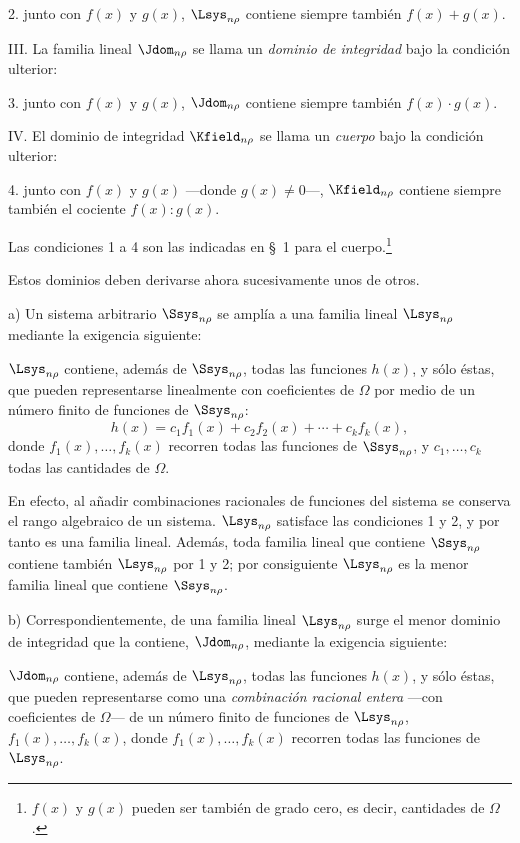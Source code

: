\documentclass[11pt]{article}
\begin{document}
2. junto con $f(x)$ y $g(x)$, $\Lsys_{n\rho}$ contiene siempre también $f(x)+g(x)$.

III. La familia lineal $\Jdom_{n\rho}$ se llama un \emph{dominio de integridad} bajo la condición ulterior:

3. junto con $f(x)$ y $g(x)$, $\Jdom_{n\rho}$ contiene siempre también $f(x)\cdot g(x)$.

IV. El dominio de integridad $\Kfield_{n\rho}$ se llama un \emph{cuerpo} bajo la condición ulterior:

4. junto con $f(x)$ y $g(x)$ ---donde $g(x)\ne0$---, $\Kfield_{n\rho}$ contiene siempre también el cociente $f(x):g(x)$.

Las condiciones 1 a 4 son las indicadas en \S\ 1 para el cuerpo.\footnote{$f(x)$ y $g(x)$ pueden ser también de grado cero, es decir, cantidades de $\Omega$.}

Estos dominios deben derivarse ahora sucesivamente unos de otros.

a) Un sistema arbitrario $\Ssys_{n\rho}$ se amplía a una familia lineal $\Lsys_{n\rho}$ mediante la exigencia siguiente:

$\Lsys_{n\rho}$ contiene, además de $\Ssys_{n\rho}$, todas las funciones $h(x)$, y sólo éstas, que pueden representarse linealmente con coeficientes de $\Omega$ por medio de un número finito de funciones de $\Ssys_{n\rho}$:
\[
  h(x)=c_1f_1(x)+c_2f_2(x)+\cdots+c_kf_k(x),
\]
donde $f_1(x),\ldots,f_k(x)$ recorren todas las funciones de $\Ssys_{n\rho}$, y $c_1,
\ldots,c_k$ todas las cantidades de $\Omega$.

En efecto, al añadir combinaciones racionales de funciones del sistema se conserva el rango algebraico de un sistema. $\Lsys_{n\rho}$ satisface las condiciones 1 y 2, y por tanto es una familia lineal. Además, toda familia lineal que contiene $\Ssys_{n\rho}$ contiene también $\Lsys_{n\rho}$ por 1 y 2; por consiguiente $\Lsys_{n\rho}$ es la menor familia lineal que contiene $\Ssys_{n\rho}$.

b) Correspondientemente, de una familia lineal $\Lsys_{n\rho}$ surge el menor dominio de integridad que la contiene, $\Jdom_{n\rho}$, mediante la exigencia siguiente:

$\Jdom_{n\rho}$ contiene, además de $\Lsys_{n\rho}$, todas las funciones $h(x)$, y sólo éstas, que pueden representarse como una \emph{combinación racional entera} ---con coeficientes de $\Omega$--- de un número finito de funciones de $\Lsys_{n\rho}$, $f_1(x),\ldots,f_k(x)$, donde $f_1(x),\ldots,f_k(x)$ recorren todas las funciones de $\Lsys_{n\rho}$.
\end{document}
